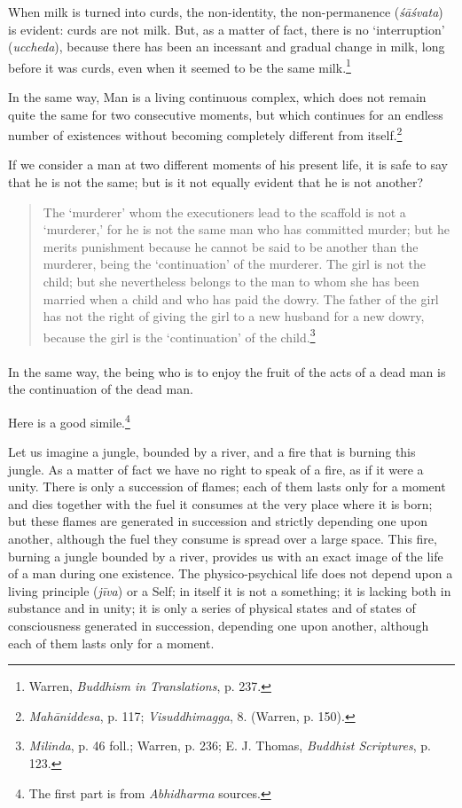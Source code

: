\documentclass[a4paper, 11pt, oneside, english, landscape]{article}
\begin{document}
When milk is turned into curds, the non-identity, the non-permanence (\emph{śāśvata}) is evident: curds are not milk. But, as a matter of fact, there is no `interruption' (\emph{uccheda}), because there has been an incessant and gradual change in milk, long before it was curds, even when it seemed to be the same milk.\footnote{Warren, \emph{Buddhism in Translations}, p. 237.}

In the same way, Man is a living continuous complex, which does not remain quite the same for two consecutive moments, but which continues for an endless number of existences without becoming completely different from itself.\footnote{\emph{Mahāniddesa}, p. 117; \emph{Visuddhimagga}, 8. (Warren, p. 150).}

If we consider a man at two different moments of his present life, it is safe to say that he is not the same; but is it not equally evident that he is not another?
\begin{quotation}
\small
The `murderer' whom the executioners lead to the scaffold is not a `murderer,' for he is not the same man who has committed murder; but he merits punishment because he cannot be said to be another than the murderer, being the `continuation' of the murderer. The girl is not the child; but she nevertheless belongs to the man to whom she has been married when a child and who has paid the dowry. The father of the girl has not the right of giving the girl to a new husband for a new dowry, because the girl is the `continuation' of the child.\footnote{\emph{Milinda}, p. 46 foll.; Warren, p. 236; E. J. Thomas, \emph{Buddhist Scriptures}, p. 123.}
\end{quotation}
\paragraph{}
In the same way, the being who is to enjoy the fruit of the acts of a dead man is the continuation of the dead man.

Here is a good simile.\footnote{The first part is from \emph{Abhidharma} sources.}

Let us imagine a jungle, bounded by a river, and a fire that is burning this jungle. As a matter of fact we have no right to speak of a fire, as if it were a unity. There is only a succession of flames; each of them lasts only for a moment and dies together with the fuel it consumes at the very place where it is born; but these flames are generated in succession and strictly depending one upon another, although the fuel they consume is spread over a large space. This fire, burning a jungle bounded by a river, provides us with an exact image of the life of a man during one existence. The physico-psychical life does not depend upon a living principle (\emph{jīva}) or a Self; in itself it is not a something; it is lacking both in substance and in unity; it is only a series of physical states and of states of consciousness generated in succession, depending one upon another, although each of them lasts only for a moment.
\end{document}
